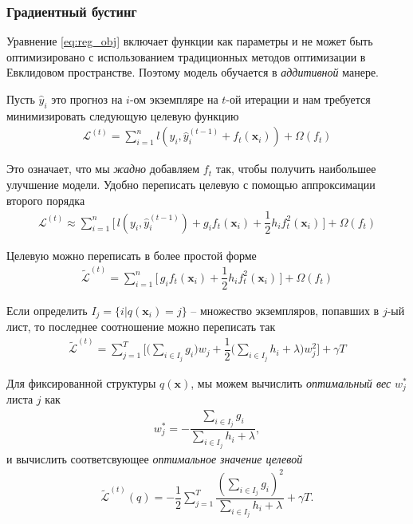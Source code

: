 \documentclass[%
	11pt,
	a4paper,
	utf8,
		]{article}
\begin{document}
\subsubsection{Градиентный бустинг}

Уравнение \eqref{eq:reg_obj} включает функции как параметры и не может быть оптимизировано с использованием традиционных методов оптимизации в Евклидовом пространстве. Поэтому модель обучается в \emph{аддитивной} манере.

Пусть $ \hat{y}_i $ это прогноз на $ i $-ом экземпляре на $ t $-ой итерации и нам требуется минимизировать следующую целевую функцию
\begin{align*}
	\mathcal{L}^{(t)} = \sum_{i=1}^n l(y_i, \hat{y}_i^{(t-1)} + f_t(\mathbf{x}_i)) + \Omega(f_t)
\end{align*}

Это означает, что мы \emph{жадно} добавляем $ f_t $ так, чтобы получить наибольшее улучшение модели. Удобно переписать целевую с помощью аппроксимации второго порядка
\begin{align*}
	\mathcal{L}^{(t)} \approx \sum_{i=1}^n \big[ \, l(y_i, \hat{y}_i^{(t-1)}) + g_i f_t(\mathbf{x}_i) + \dfrac{1}{2}h_i f_t^2(\mathbf{x}_i) \, \big] + \Omega(f_t)
\end{align*}

Целевую можно переписать в более простой форме
\begin{align*}
	\tilde{\mathcal{L}}^{(t)} = \sum_{i=1}^n \big[ \, g_i f_t(\mathbf{x}_i) + \dfrac{1}{2} h_i f_t^2(\mathbf{x}_i) \, \big] + \Omega(f_t)
\end{align*}

Если определить $ I_j = \{ i | q(\mathbf{x}_i) = j \} $ -- множество экземпляров, попавших в $ j $-ый лист, то последнее соотношение можно переписать так
\begin{align*}
	\tilde{\mathcal{L}}^{(t)} = \sum_{j=1}^T \Big[ \big( \sum_{ i \in I_j }g_i \big) w_j + \dfrac{1}{2} \big( \sum_{i \in I_j} h_i + \lambda \big) w_j^2 \Big] + \gamma T
\end{align*}

Для фиксированной структуры $ q(\mathbf{x}) $, мы можем вычислить \emph{оптимальный вес} $ w_j^* $ листа $ j $ как
\begin{align*}
	w_j^* = - \dfrac{ \sum_{i \in I_j} g_i }{ \sum_{ i \in I_j } h_i +\lambda },
\end{align*}
и вычислить соответсвующее \emph{оптимальное значение целевой}
\begin{align}\label{eq:l_obj_opt}
	\tilde{\mathcal{L}}^{(t)}(q) = - \dfrac{1}{2} \sum_{j=1}^T \dfrac{ (\sum_{ i \in I_j } g_i)^2 }{ \sum_{ i \in I_j } h_i + \lambda } + \gamma T.
\end{align}
\end{document}

